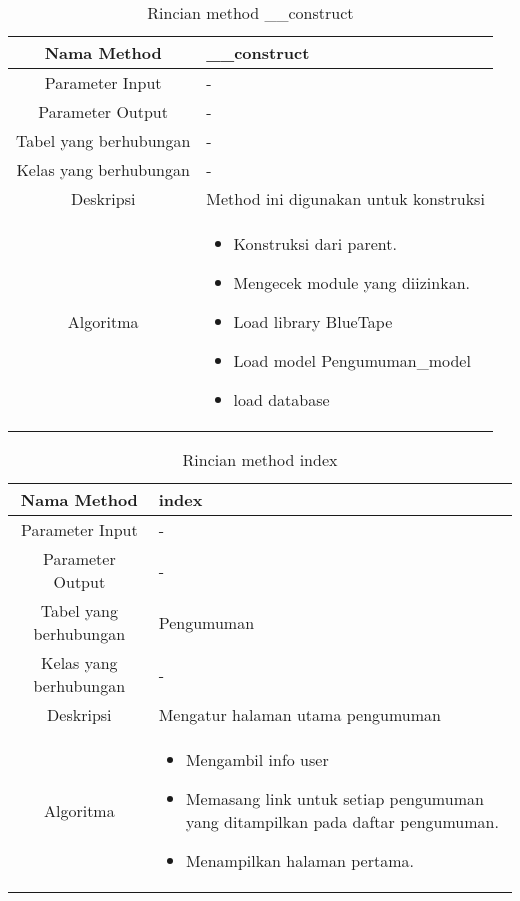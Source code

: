 \begin{center}
	\begin{table}[H]
	\caption{Rincian method \_\_construct}
	\label{table:pengumuman-construct}
\begin{tabular}{|c|p{11cm}|}
\hline
Nama Method 	& 	 	\_\_construct \\
\hline
Parameter Input & - \\
\hline
Parameter Output & - \\
\hline
Tabel yang berhubungan & -\\
\hline
Kelas yang berhubungan &  - \\
\hline
Deskripsi	& Method ini digunakan untuk konstruksi\\
\hline
Algoritma	& \begin{itemize}
				\item Konstruksi dari parent.
				\item Mengecek module yang diizinkan.
				\item Load library BlueTape
				\item Load model Pengumuman\_model
				\item load database
				\end{itemize} \\
\hline
\end{tabular}
\end{table}
\end{center}

\begin{center}
	\begin{table}[H]
	\caption{Rincian method index}
	\label{table:pengumuman-index}
\begin{tabular}{|c|p{11cm}|}
\hline
Nama Method 	& 	 index	\\
\hline
Parameter Input & - \\
\hline
Parameter Output & - \\
\hline
Tabel yang berhubungan & Pengumuman \\
\hline
Kelas yang berhubungan & - \\
\hline
Deskripsi	& Mengatur halaman utama pengumuman\\
\hline
Algoritma	& \begin{itemize}
				\item Mengambil info user
				\item Memasang link untuk setiap pengumuman yang ditampilkan pada daftar pengumuman.
				\item Menampilkan halaman pertama.
				\end{itemize} \\
\hline
\end{tabular}
\end{table}
\end{center}

